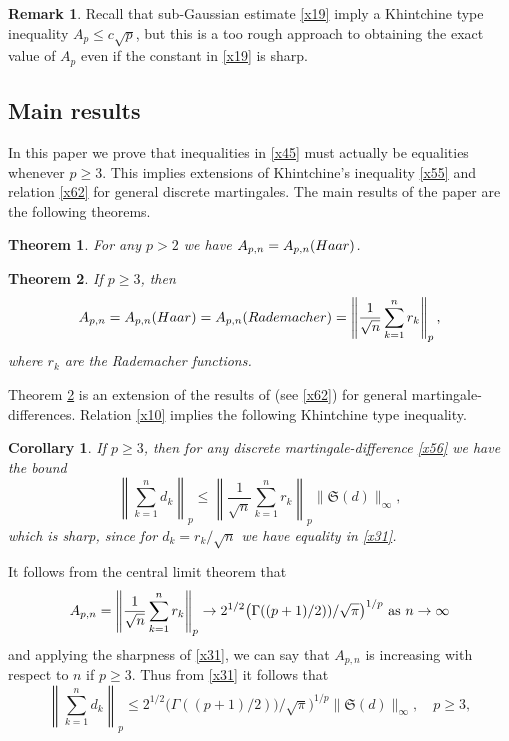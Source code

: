 \documentclass[12pt,reqno,fleqn]{amsart}
\newtheorem{theorem}{Theorem}[section]
\newtheorem{corollary}{Corollary}[section]
\theoremstyle{definition}
\theoremstyle{definition}
\newtheorem{remark}{Remark}[section]
\theoremstyle{remark}
\def\ZS{\ensuremath{\mathfrak S}}
\numberwithin{equation}{section}
\newcommand {\e }[1]{\eqref{#1}}
\newcommand {\trm }[1]{Theorem \ref{#1}}
\begin{document}
\begin{remark}
	Recall that sub-Gaussian estimate \e{x19} imply a Khintchine type inequality $A_p\le c\sqrt p$, but this is a too rough approach to obtaining the exact value of $A_p$ even if the constant in \e{x19} is sharp. 
\end{remark}
\subsection{Main results}
In this paper we prove that inequalities in \e{x45} must actually be equalities whenever $p\ge 3$. This implies extensions of Khintchine's inequality \e{x55} and relation \e{x62} for general discrete martingales. The main results of the paper are the following theorems.
\begin{theorem}\label{T1}
	For any $p> 2$ we have  $	A_{p,n}=A_{p,n}({\rm Haar})$.
\end{theorem}
\begin{theorem}\label{T2}
	If $p\ge 3$, then 
	\begin{equation}\label{x10}
	A_{p,n}=A_{p,n}({\rm Haar})=A_{p,n}({\rm Rademacher})=\left\|\frac{1}{\sqrt{n}}\sum_{k=1}^nr_k\right\|_p,
\end{equation}
where $r_k$ are the Rademacher functions.
\end{theorem}
\trm{T2} is an extension of the results of \cite{Kom} (see \e{x62}) for general martingale-differences. Relation \e{x10} implies the following Khintchine type inequality.
\begin{corollary}\label{C1}
	If $p\ge 3$, then for any discrete martingale-difference \e{x56} we have the bound
	\begin{equation}\label{x31}
	\left\|\sum_{k=1}^nd_k\right\|_p\le \left\|\frac{1}{\sqrt{n}}\sum_{k=1}^nr_k\right\|_p \|\ZS(d)\|_\infty,
	\end{equation}
which is sharp, since for $d_k=r_k/\sqrt{n}$ we have equality in \e{x31}.
\end{corollary}
It follows from the central limit theorem that
\begin{equation}
	A_{p,n}=\left\|\frac{1}{\sqrt{n}}\sum_{k=1}^nr_k\right\|_p \to 2^{1/2}\big(\Gamma((p+1)/2))/\sqrt{\pi}\big)^{1/p} \hbox{ as } n\to\infty
\end{equation}
and applying the sharpness of \e{x31}, we can say that $A_{p,n}$ is increasing with respect to $n$ if $p\ge 3$. Thus from \e{x31} it follows that 
\begin{equation}\label{x58}
	\left\|\sum_{k=1}^nd_k\right\|_p\le 2^{1/2}\big(\Gamma((p+1)/2))/\sqrt{\pi}\big)^{1/p}\|\ZS(d)\|_\infty,\quad p\ge 3,
\end{equation}
\end{document}
